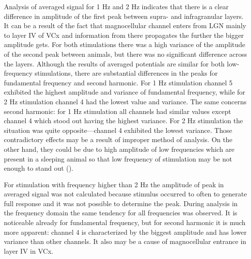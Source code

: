\documentclass{pracalicmgr}
\begin{document}
    Analysis of averaged signal for 1 Hz and 2 Hz indicates that there is a clear difference in amplitude of the first peak between supra- and infragranular layers. It can be a result of the fact that magnocellular channel enters from LGN mainly to layer IV of VCx and information from there propagates the further the bigger amplitude gets. For both stimulations there was a high variance of the amplitude of the second peak between animals, but there was no significant difference across the layers. Although the results of averaged potentials are similar for both low-frequency stimulations, there are substantial differences in the peaks for fundamental frequency and second harmonic. For 1 Hz stimulation channel 5 exhibited the highest amplitude and variance of fundamental frequency, while for 2 Hz stimulation channel 4 had the lowest value and variance. The same concerns second harmonic: for 1 Hz stimulation all channels had similar values except channel 4 which stood out having the highest variance. For 2 Hz stimulation the situation was quite opposite---channel 4 exhibited the lowest variance. Those contradictory effects may be a result of improper method of analysis. On the other hand, they could be due to high amplitude of low frequencies which are present in a sleeping animal so that low frequency of stimulation may be not enough to stand out (\cite{ja}).
    
    For stimulation with frequency higher than 2 Hz the amplitude of peak in averaged signal was not calculated because stimulus occurred to often to generate full response and it was not possible to determine the peak. During analysis in the frequency domain the same tendency for all frequencies was observed. It is noticeable already for fundamental frequency, but for second harmonic it is much more apparent: channel 4 is characterized by the biggest amplitude and has lower variance than other channels. It also may be a cause of magnocellular entrance in layer IV in VCx.
    
    

\printbibliography[heading=bibintoc]
\end{document}

